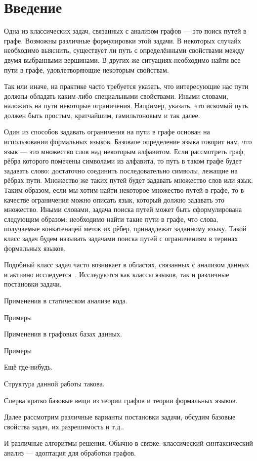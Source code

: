 \section{Введение}


Одна из классических задач, связанных с анализом графов --- это поиск путей в графе.
Возможны различные формулировки этой задачи.
В некоторых случайх необходимо выяснить, существует ли путь с определёнными свойствами между двумя выбранными вершинами.
В других же ситуациях необходимо найти все пути в графе, удовлетворяющие некоторым свойствам.

Так или иначе, на практике часто требуется указать, что интересующие нас пути должны обладать каким-либо специальными свойствами.
Иными словами, наложить на пути некоторые ограничения.
Например, указать, что искомый путь должен быть простым, кратчайшим, гамильтоновым и так далее.

Один из способов задавать ограничения на пути в графе основан на использовании формальных языков.
Базоваое определение языка говорит нам, что язык --- это множество слов над некоторым алфавитом.
Если рассмотреть граф, рёбра которого помечены символами из алфавита, то путь в таком графе будет задавать слово: достаточно соединить последовательно символы, лежащие на рёбрах пути.
Множество же таких путей будет задавать множество слов или язык.
Таким образом, если мы хотим найти некоторое множество путей в графе, то в качестве ограничения можно описать язык, который должно задавать это множество.
Иными словами, задача поиска путей может быть сформулирована следующим образом: необходимо найти такие пути в графе, что слова, получаемые конкатенацей меток их рёбер, принадлежат заданному языку.
Такой класс задач будем называть задачами поиска путей с ограничениям в теринах формальных языков.

Подобный класс задач часто возникает в областях, связанных с анализом данных и активно исследуется~\cite{doi:10.1137/S0097539798337716,axelsson2011formal,10.1007/978-3-642-22321-1_24,Ward:2010:CRL:1710158.1710234,barrett2007label,doi:10.1137/S0097539798337716}.
Исследуются как классы языков, так и различные постановки задачи.

Применения в статическом анализе кода.
\begin{example}
Примеры
\end{example}

Применения в графовых базах данных.
\begin{example}
Примеры
\end{example}

Ещё где-нибудь.

Структура данной работы такова.

Сперва кратко базовые вещи из теории графов и теории формальных языков.

Далее рассмотрим различные варианты постановки задачи, обсудим базовые свойства задач, их разрешимость и т.д..

И различные алгоритмы решения.
Обычно в связке: классический синтаксический анализ --- адоптация для обработки графов.


